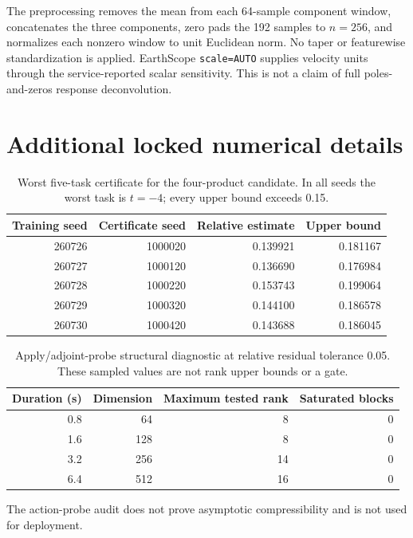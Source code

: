 \documentclass[11pt]{article}
\begin{document}
The preprocessing removes the mean from each 64-sample component window,
concatenates the three components, zero pads the 192 samples to $n=256$, and
normalizes each nonzero window to unit Euclidean norm.  No taper or
featurewise standardization is applied.  EarthScope
\texttt{scale=AUTO} supplies velocity units through the service-reported
scalar sensitivity.  This is not a claim of full poles-and-zeros response
deconvolution.

\section{Additional locked numerical details}

\begin{table}[h]
\caption{Worst five-task certificate for the four-product candidate.  In all
seeds the worst task is $t=-4$; every upper bound exceeds 0.15.}
\centering
\small
\begin{tabular}{rrrr}
\toprule
Training seed & Certificate seed & Relative estimate & Upper bound\\
\midrule
260726 & 1000020 & 0.139921 & 0.181167\\
260727 & 1000120 & 0.136690 & 0.176984\\
260728 & 1000220 & 0.153743 & 0.199064\\
260729 & 1000320 & 0.144100 & 0.186578\\
260730 & 1000420 & 0.143688 & 0.186045\\
\bottomrule
\end{tabular}
\end{table}

\begin{table}[h]
\caption{Apply/adjoint-probe structural diagnostic at relative residual
tolerance 0.05.  These sampled values are not rank upper bounds or a gate.}
\centering
\small
\begin{tabular}{rrrr}
\toprule
Duration (s) & Dimension & Maximum tested rank & Saturated blocks\\
\midrule
0.8 & 64 & 8 & 0\\
1.6 & 128 & 8 & 0\\
3.2 & 256 & 14 & 0\\
6.4 & 512 & 16 & 0\\
\bottomrule
\end{tabular}
\end{table}

The action-probe audit does not prove asymptotic compressibility and is not
used for deployment.
\end{document}
